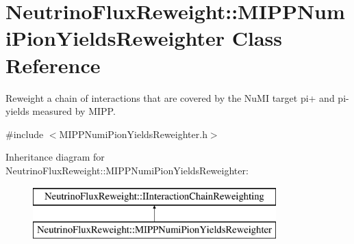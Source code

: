 \hypertarget{class_neutrino_flux_reweight_1_1_m_i_p_p_numi_pion_yields_reweighter}{\section{Neutrino\-Flux\-Reweight\-:\-:M\-I\-P\-P\-Numi\-Pion\-Yields\-Reweighter Class Reference}
\label{class_neutrino_flux_reweight_1_1_m_i_p_p_numi_pion_yields_reweighter}
}


Reweight a chain of interactions that are covered by the Nu\-M\-I target pi+ and pi-\/ yields measured by M\-I\-P\-P.  




{\ttfamily \#include $<$M\-I\-P\-P\-Numi\-Pion\-Yields\-Reweighter.\-h$>$}

Inheritance diagram for Neutrino\-Flux\-Reweight\-:\-:M\-I\-P\-P\-Numi\-Pion\-Yields\-Reweighter\-:\begin{figure}[H]
\begin{center}
\leavevmode
\includegraphics[height=2.000000cm]{class_neutrino_flux_reweight_1_1_m_i_p_p_numi_pion_yields_reweighter}
\end{center}
\end{figure}
